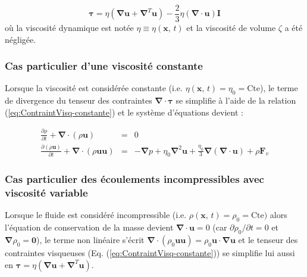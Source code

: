\begin{equation}
\boldsymbol{\tau}=\eta(\boldsymbol{\nabla}\mathbf{u}+\boldsymbol{\nabla}^{T}\mathbf{u})-\frac{2}{3}\eta(\boldsymbol{\nabla}\cdot\mathbf{u})\mathbf{I}\label{eq:Bilan_TenseurContrainte}
\end{equation}
o\`u la viscosit\'e dynamique est not\'ee $\eta\equiv\eta(\mathbf{x},\,t)$
et la viscosit\'e de volume $\zeta$ a \'et\'e n\'eglig\'ee.


\subsubsection{Cas particulier d'une viscosit\'e constante}

Lorsque la viscosit\'e est consid\'er\'ee constante (i.e. $\eta(\mathbf{x},\,t)=\eta_{0}=\mbox{Cte}$),
le terme de divergence du tenseur des contraintes $\boldsymbol{\nabla}\cdot\boldsymbol{\tau}$
se simplifie \`a l'aide de la relation (\ref{eq:ContraintVisq-constante})
et le syst\`eme d'\'equations devient :

\begin{subequations}

\begin{eqnarray}
\frac{\partial\rho}{\partial t}+\boldsymbol{\nabla}\cdot(\rho\mathbf{u}) & = & 0\label{eq:Bilan_ConservMasse-1}\\
\frac{\partial(\rho\mathbf{u})}{\partial t}+\boldsymbol{\nabla}\cdot(\rho\mathbf{u}\mathbf{u}) & = & -\boldsymbol{\nabla}p+\eta_{0}\boldsymbol{\nabla}^{2}\mathbf{u}+\frac{\eta_{0}}{3}\boldsymbol{\nabla}(\boldsymbol{\nabla}\cdot\mathbf{u})+\rho\mathbf{F}_{v}\label{eq:Bilan_QDM-1}
\end{eqnarray}


\end{subequations}


\subsubsection{Cas particulier des \'ecoulements incompressibles avec viscosit\'e variable}

Lorsque le fluide est consid\'er\'e incompressible (i.e. $\rho(\mathbf{x},\,t)=\rho_{0}=\mbox{Cte})$
alors l'\'equation de conservation de la masse devient $\boldsymbol{\nabla}\cdot\mathbf{u}=0$
(car $\partial\rho_{0}/\partial t=0$ et $\boldsymbol{\nabla}\rho_{0}=\mathbf{0}$),
le terme non lin\'eaire s'\'ecrit $\boldsymbol{\nabla}\cdot(\rho_{0}\mathbf{u}\mathbf{u})=\rho_{0}\mathbf{u}\cdot\boldsymbol{\nabla}\mathbf{u}$
et le tenseur des contraintes visqueuses (Eq. (\ref{eq:ContraintVisq-constante}))
se simplifie lui aussi en $\boldsymbol{\tau}=\eta(\boldsymbol{\nabla}\mathbf{u}+\boldsymbol{\nabla}^{T}\mathbf{u})$. 

